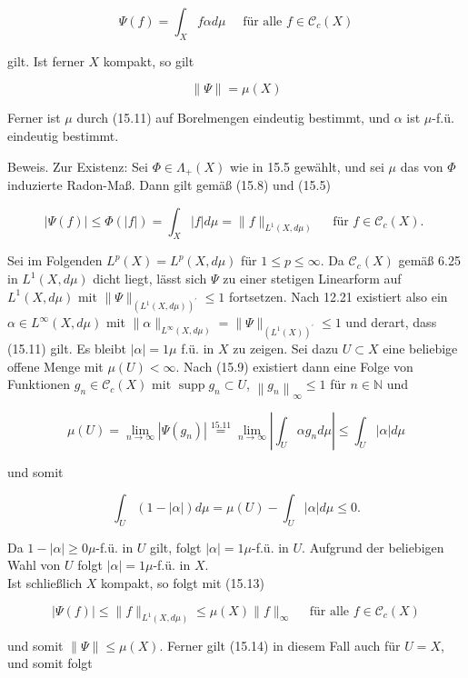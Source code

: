 \documentclass[10pt, letterpaper]{article}
\begin{document}
$$
\Psi(f)=\int_{X} f \alpha d \mu \quad \text { für alle } f \in \mathcal{C}_{c}(X)
$$

gilt. Ist ferner $X$ kompakt, so gilt

$$
\|\Psi\|=\mu(X)
$$

Ferner ist $\mu$ durch (15.11) auf Borelmengen eindeutig bestimmt, und $\alpha$ ist $\mu$-f.ü. eindeutig bestimmt.

Beweis. Zur Existenz: Sei $\Phi \in \Lambda_{+}(X)$ wie in 15.5 gewählt, und sei $\mu$ das von $\Phi$ induzierte Radon-Maß. Dann gilt gemäß (15.8) und (15.5)

$$
|\Psi(f)| \leq \Phi(|f|)=\int_{X}|f| d \mu=\|f\|_{L^{1}(X, d \mu)} \quad \text { für } f \in \mathcal{C}_{c}(X) \text {. }
$$

Sei im Folgenden $L^{p}(X)=L^{p}(X, d \mu)$ für $1 \leq p \leq \infty$. Da $\mathcal{C}_{c}(X)$ gemäß 6.25 in $L^{1}(X, d \mu)$ dicht liegt, lässt sich $\Psi$ zu einer stetigen Linearform auf $L^{1}(X, d \mu)$ mit $\|\Psi\|_{\left(L^{1}(X, d \mu)\right)^{\prime}} \leq 1$ fortsetzen. Nach 12.21 existiert also ein $\alpha \in L^{\infty}(X, d \mu)$ mit $\|\alpha\|_{L^{\infty}(X, d \mu)}=\|\Psi\|_{\left(L^{1}(X)\right)^{\prime}} \leq 1$ und derart, dass (15.11) gilt. Es bleibt $|\alpha|=1 \mu$ f.ü. in $X$ zu zeigen. Sei dazu $U \subset X$ eine beliebige offene Menge mit $\mu(U)<\infty$. Nach (15.9) existiert dann eine Folge von Funktionen $g_{n} \in \mathcal{C}_{c}(X)$ mit $\operatorname{supp} g_{n} \subset U$, $\left\|g_{n}\right\|_{\infty} \leq 1$ für $n \in \mathbb{N}$ und

$$
\mu(U)=\lim _{n \rightarrow \infty}\left|\Psi\left(g_{n}\right)\right| \stackrel{15.11}{=} \lim _{n \rightarrow \infty}\left|\int_{U} \alpha g_{n} d \mu\right| \leq \int_{U}|\alpha| d \mu
$$

und somit

$$
\int_{U}(1-|\alpha|) d \mu=\mu(U)-\int_{U}|\alpha| d \mu \leq 0 .
$$

Da $1-|\alpha| \geq 0 \mu$-f.ü. in $U$ gilt, folgt $|\alpha|=1 \mu$-f.ü. in $U$. Aufgrund der beliebigen Wahl von $U$ folgt $|\alpha|=1 \mu$-f.ü. in $X$.\\
Ist schließlich $X$ kompakt, so folgt mit (15.13)

$$
|\Psi(f)| \leq\|f\|_{L^{1}(X, d \mu)} \leq \mu(X)\|f\|_{\infty} \quad \text { für alle } f \in \mathcal{C}_{c}(X)
$$

und somit $\|\Psi\| \leq \mu(X)$. Ferner gilt (15.14) in diesem Fall auch für $U=X$, und somit folgt
\end{document}

